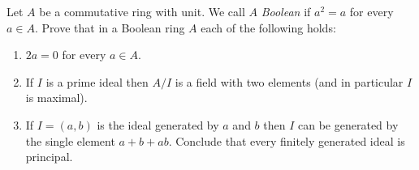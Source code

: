 \documentclass[11pt,twoside,openany]{memoir}
\begin{document}
\begin{problem}
Let $A$ be a commutative ring with unit. We call $A$ \textit{Boolean} if $a^2 = a$ for every $a \in A$. Prove that in a Boolean ring $A$ each of the following holds:
\begin{enumerate}[label = (\alph*),itemsep=1pt,topsep=3pt]
    \item $2a = 0$ for every $a \in A$.
    \item If $I$ is a prime ideal then $A/I$ is a field with two elements (and in particular $I$ is maximal).
    \item If $I=(a,b)$ is the ideal generated by $a$ and $b$ then $I$ can be generated by the single element $a+b+ab$. Conclude that every finitely generated ideal is principal.
\end{enumerate} 
\end{problem}
\end{document}

